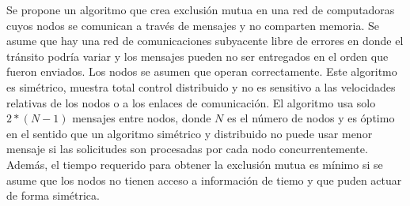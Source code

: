Se propone un algoritmo que crea exclusión mutua en una red de computadoras cuyos nodos se comunican a través de mensajes y no comparten memoria. Se asume que hay una red de comunicaciones subyacente libre de errores en donde el tránsito podría variar y los mensajes pueden no ser entregados en el orden que fueron enviados. Los nodos se asumen que operan correctamente. Este algoritmo es simétrico, muestra total control distribuido y no es sensitivo a las velocidades relativas de los nodos o a los enlaces de comunicación. El algoritmo usa solo $2*(N-1)$ mensajes entre nodos, donde $N$ es el número de nodos y es óptimo en el sentido que un algoritmo simétrico y distribuido no puede usar menor mensaje si las solicitudes son procesadas por cada nodo concurrentemente. Además, el tiempo requerido para obtener la exclusión mutua es mínimo si se asume que los nodos no tienen acceso a información de tiemo y que puden actuar de forma simétrica.

